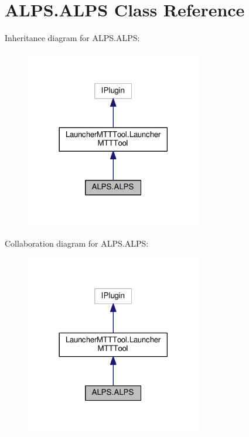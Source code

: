 \hypertarget{class_a_l_p_s_1_1_a_l_p_s}{\section{A\-L\-P\-S.\-A\-L\-P\-S Class Reference}
\label{class_a_l_p_s_1_1_a_l_p_s}
}


Inheritance diagram for A\-L\-P\-S.\-A\-L\-P\-S\-:
\nopagebreak
\begin{figure}[H]
\begin{center}
\leavevmode
\includegraphics[width=218pt]{class_a_l_p_s_1_1_a_l_p_s__inherit__graph}
\end{center}
\end{figure}


Collaboration diagram for A\-L\-P\-S.\-A\-L\-P\-S\-:
\nopagebreak
\begin{figure}[H]
\begin{center}
\leavevmode
\includegraphics[width=218pt]{class_a_l_p_s_1_1_a_l_p_s__coll__graph}
\end{center}
\end{figure}
